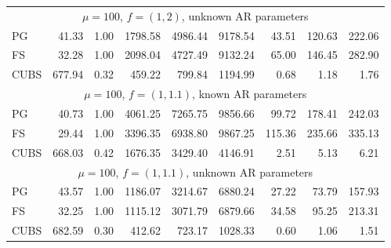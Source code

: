 \documentclass[12pt]{article}
\begin{document}
\begin{table}
\begin{center}
\begin{tabular}{l r r r r r r r r }
 \\ %

 \multicolumn{9}{c}{$\mu=100$, $f = (1,2)$, unknown AR parameters} \\
             PG   &    41.33 &     1.00 &   1798.58 &   4986.44 &   9178.54 &     43.51 &    120.63 &    222.06 \\ 
             FS   &    32.28 &     1.00 &   2098.04 &   4727.49 &   9132.24 &     65.00 &    146.45 &    282.90 \\ 
           CUBS   &   677.94 &     0.32 &    459.22 &    799.84 &   1194.99 &      0.68 &      1.18 &      1.76
 \\ %

 \multicolumn{9}{c}{$\mu=100$, $f = (1,1.1)$, known AR parameters} \\
             PG   &    40.73 &     1.00 &   4061.25 &   7265.75 &   9856.66 &     99.72 &    178.41 &    242.03 \\ 
             FS   &    29.44 &     1.00 &   3396.35 &   6938.80 &   9867.25 &    115.36 &    235.66 &    335.13 \\ 
           CUBS   &   668.03 &     0.42 &   1676.35 &   3429.40 &   4146.91 &      2.51 &      5.13 &      6.21
 \\ %

 \multicolumn{9}{c}{$\mu=100$, $f = (1,1.1)$, unknown AR parameters} \\
             PG   &    43.57 &     1.00 &   1186.07 &   3214.67 &   6880.24 &     27.22 &     73.79 &    157.93 \\ 
             FS   &    32.25 &     1.00 &   1115.12 &   3071.79 &   6879.66 &     34.58 &     95.25 &    213.31 \\ 
           CUBS   &   682.59 &     0.30 &    412.62 &    723.17 &   1028.33 &      0.60 &      1.06 &      1.51
 \end{tabular}
\end{center} 


\end{table}
\end{document}
